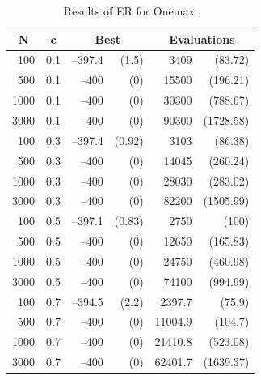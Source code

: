 \begin{table}
\centering
\caption{Results of ER for Onemax.}
\begin{tabular}{|r|r|rr|rr|}
\hline
\multicolumn{1}{|c|}{N} & \multicolumn{1}{|c|}{c} & 
\multicolumn{2}{c|}{Best} & \multicolumn{2}{c|}{Evaluations} \\ \hline
100 & 0.1 & --397.4 &  (1.5) & 3409 &  (83.72) \\ \hline
500 & 0.1 & --400 &  (0) & 15500 &  (196.21) \\ \hline
1000 & 0.1 & --400 &  (0) & 30300 &  (788.67) \\ \hline
3000 & 0.1 & --400 &  (0) & 90300 &  (1728.58) \\ \hline
100 & 0.3 & --397.4 &  (0.92) & 3103 &  (86.38) \\ \hline
500 & 0.3 & --400 &  (0) & 14045 &  (260.24) \\ \hline
1000 & 0.3 & --400 &  (0) & 28030 &  (283.02) \\ \hline
3000 & 0.3 & --400 &  (0) & 82200 &  (1505.99) \\ \hline
100 & 0.5 & --397.1 &  (0.83) & 2750 &  (100) \\ \hline
500 & 0.5 & --400 &  (0) & 12650 &  (165.83) \\ \hline
1000 & 0.5 & --400 &  (0) & 24750 &  (460.98) \\ \hline
3000 & 0.5 & --400 &  (0) & 74100 &  (994.99) \\ \hline
100 & 0.7 & --394.5 &  (2.2) & 2397.7 &  (75.9) \\ \hline
500 & 0.7 & --400 &  (0) & 11004.9 &  (104.7) \\ \hline
1000 & 0.7 & --400 &  (0) & 21410.8 &  (523.08) \\ \hline
3000 & 0.7 & --400 &  (0) & 62401.7 &  (1639.37) \\ \hline
\end{tabular}
\label{result_0d_idea}
\end{table}

